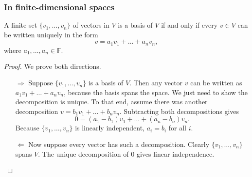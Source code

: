 \subsubsection{In finite-dimensional spaces}
\begin{proposition}
A finite set $\{v_1, \ldots, v_n\}$ of vectors in $V$ is a basis of $V$ \textup{if and only if} every $v\in V$ can be written uniquely in the form
\[ v = a_1v_1 + \ldots + a_nv_n, \]
where $a_1, \ldots, a_n \in \mathbb{F}$.
\end{proposition}
\begin{proof}
We prove both directions.
\begin{itemize}
\item[$\boxed{\Rightarrow}$] Suppose $\{v_1, \ldots, v_n\}$ is a basis of $V$. Then any vector $v$ can be written as $a_1v_1 + \ldots + a_nv_n$, because the basis spans the space. We just need to show the decomposition is unique. To that end, assume there was another decomposition $v = b_1v_1 + \ldots + b_nv_n$. Subtracting both decompositions gives
\[ 0 = (a_1-b_1)v_1 + \ldots + (a_n-b_n)v_n. \]
Because $\{v_1, \ldots, v_n\}$ is linearly independent, $a_i = b_i$ for all $i$.
\item[$\boxed{\Leftarrow}$] Now suppose every vector has such a decomposition. Clearly $\{v_1, \ldots, v_n\}$ spans $V$. The unique decomposition of $0$ gives linear independence.
\end{itemize}
\end{proof}

